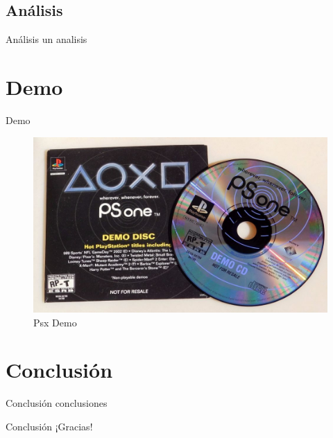 \subsection{Análisis}

\begin{frame}{Análisis}
    un analisis
\end{frame}




\section{Demo}

\begin{frame}{Demo}
    \begin{figure}[H]
        \centering
        \includegraphics[scale=0.2]{presentaciones/img/demopsx.jpg}
        \caption{Psx Demo}
        \label{psx}
    \end{figure}
\end{frame}

\section{Conclusión}

\begin{frame}{Conclusión}
    conclusiones
\end{frame}


\begin{frame}{Conclusión}
    \centering
    \Huge ¡Gracias!
\end{frame}


